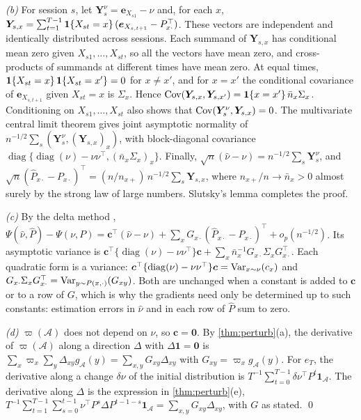 \emph{(b)} For session $s$, let $\bm Y^{\nu}_s=\bm e_{X_{s1}}-\nu$ and, for each $x$, $\bm Y_{s,x}=\sum_{t=1}^{T-1}\mathbf{1}\!\left\{X_{st}=x\right\}(\bm e_{X_{s,t+1}}-P_{x\cdot}^{\top})$. These vectors are independent and identically distributed across sessions. Each summand of $\bm Y_{s,x}$ has conditional mean zero given $X_{s1},\dots,X_{st}$, so all the vectors have mean zero, and cross-products of summands at different times have mean zero. At equal times, $\mathbf{1}\!\left\{X_{st}=x\right\}\mathbf{1}\!\left\{X_{st}=x'\right\}=0$ for $x\neq x'$, and for $x=x'$ the conditional covariance of $\bm e_{X_{s,t+1}}$ given $X_{st}=x$ is $\Sigma_x$. Hence $\operatorname{Cov}(\bm Y_{s,x},\bm Y_{s,x'})=\mathbf{1}\!\left\{x=x'\right\}\bar n_x\Sigma_x$. Conditioning on $X_{s1},\dots,X_{st}$ also shows that $\operatorname{Cov}(\bm Y^{\nu}_s,\bm Y_{s,x})=0$. The multivariate central limit theorem gives joint asymptotic normality of $n^{-1/2}\sum_s(\bm Y^\nu_s,(\bm Y_{s,x})_x)$, with block-diagonal covariance $\operatorname{diag}\{\operatorname{diag}(\nu)-\nu\nu^{\top},(\bar n_x\Sigma_x)_x\}$. Finally, $\sqrt n(\hat\nu-\nu)=n^{-1/2}\sum_s\bm Y^\nu_s$, and $\sqrt n(\hat P_{x\cdot}-P_{x\cdot})^{\top}=(n/n_{x+})\,n^{-1/2}\sum_s\bm Y_{s,x}$, where $n_{x+}/n\to\bar n_x>0$ almost surely by the strong law of large numbers. Slutsky's lemma completes the proof.

\emph{(c)} By the delta method \citep[Thm.~3.1]{vandervaart1998}, $\Psi(\hat\nu,\hat P)-\Psi(\nu,P)=\bm c^{\top}(\hat\nu-\nu)+\sum_xG_{x\cdot}(\hat P_{x\cdot}-P_{x\cdot})^{\top}+o_p(n^{-1/2})$. Its asymptotic variance is $\bm c^{\top}\{\operatorname{diag}(\nu)-\nu\nu^{\top}\}\bm c+\sum_x\bar n_x^{-1}G_{x\cdot}\Sigma_xG_{x\cdot}^{\top}$. Each quadratic form is a variance: $\bm c^{\top}\{\operatorname{diag}(\nu)-\nu\nu^{\top}\}\bm c=\operatorname{Var}_{x\sim\nu}(c_x)$ and $G_{x\cdot}\Sigma_xG_{x\cdot}^{\top}=\operatorname{Var}_{y\sim P(x,\cdot)}(G_{xy})$. Both are unchanged when a constant is added to $\bm c$ or to a row of $G$, which is why the gradients need only be determined up to such constants: estimation errors in $\hat\nu$ and in each row of $\hat P$ sum to zero.

\emph{(d)} $\varpi(\mathcal A)$ does not depend on $\nu$, so $\bm c=\bm0$. By \cref{thm:perturb}(a), the derivative of $\varpi(\mathcal A)$ along a direction $\Delta$ with $\Delta\bm1=\bm0$ is $\sum_x\varpi_x\sum_y\Delta_{xy}g_{\mathcal A}(y)=\sum_{x,y}G_{xy}\Delta_{xy}$ with $G_{xy}=\varpi_xg_{\mathcal A}(y)$. For $e_T$, the derivative along a change $\delta\nu$ of the initial distribution is $T^{-1}\sum_{t=0}^{T-1}\delta\nu^{\top}P^{t}\bm1_{\mathcal A}$. The derivative along $\Delta$ is the expression in \cref{thm:perturb}(e), $T^{-1}\sum_{t=1}^{T-1}\sum_{s=0}^{t-1}\nu^{\top}P^{s}\Delta P^{t-1-s}\bm1_{\mathcal A}=\sum_{x,y}G_{xy}\Delta_{xy}$, with $G$ as stated. \qed
